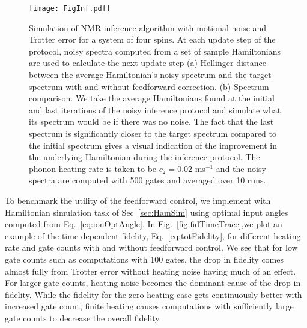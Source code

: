 \documentclass[prx,aps,twocolumn,showpacs,superscriptaddress,10pt]{revtex4-1}
\begin{document}
\begin{figure*}[t!]
	\centering
	\texttt{[image: FigInf.pdf]}
	\caption{Simulation of NMR inference algorithm with motional noise and Trotter error for a system of four spins. At each update step of the protocol, noisy spectra computed from a set of sample Hamiltonians are used to calculate the next update step (a) Hellinger distance between the average Hamiltonian's noisy spectrum and the target spectrum with and without feedforward correction. (b) Spectrum comparison. We take the average Hamiltonians found at the initial and last iterations of the noisy inference protocol and simulate what its spectrum would be if there was no noise. The fact that the last spectrum is significantly closer to the target spectrum compared to the initial spectrum gives a visual indication of the improvement in the underlying Hamiltonian during the inference protocol. The phonon heating rate is taken to be $c_{2}=0.02$ ms$^{-1}$ and the noisy spectra are computed with 500 gates and averaged over 10 runs. }
	\label{fig:bayesianInf}
\end{figure*}

To benchmark the utility of the feedforward control, we implement with Hamiltonian simulation task of Sec~\ref{sec:HamSim} using optimal input angles computed from Eq.~\eqref{eq:ionOptAngle}. In Fig.~\ref{fig:fidTimeTrace},we plot an example of the time-dependent fidelity, Eq.~\eqref{eq:totFidelity}, for different heating rate and gate counts with and without feedforward control. We see that for low gate counts such as computations with 100 gates, the drop in fidelity comes almost fully from Trotter error without heating noise having much of an effect. For larger gate counts, heating noise becomes the dominant cause of the drop in fidelity. While the fidelity for the zero heating case gets continuously better with increased gate count, finite heating causes computations with sufficiently large gate counts to decrease the overall fidelity. 
\end{document}
